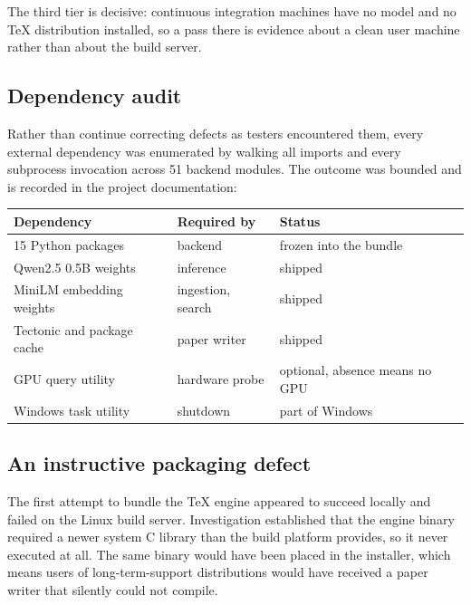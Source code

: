 \documentclass[11pt,a4paper]{article}
\begin{document}
The third tier is decisive: continuous integration machines have no model and no
TeX distribution installed, so a pass there is evidence about a clean user
machine rather than about the build server.

\subsection{Dependency audit}

Rather than continue correcting defects as testers encountered them, every
external dependency was enumerated by walking all imports and every subprocess
invocation across 51 backend modules. The outcome was bounded and is recorded in
the project documentation:

\begin{center}
\small
\begin{tabular}{@{}lll@{}}
\toprule
\textbf{Dependency} & \textbf{Required by} & \textbf{Status} \\
\midrule
15 Python packages & backend & frozen into the bundle \\
Qwen2.5 0.5B weights & inference & shipped \\
MiniLM embedding weights & ingestion, search & shipped \\
Tectonic and package cache & paper writer & shipped \\
GPU query utility & hardware probe & optional, absence means no GPU \\
Windows task utility & shutdown & part of Windows \\
\bottomrule
\end{tabular}
\end{center}

\subsection{An instructive packaging defect}

The first attempt to bundle the TeX engine appeared to succeed locally and
failed on the Linux build server. Investigation established that the engine
binary required a newer system C library than the build platform provides, so it
never executed at all. The same binary would have been placed in the installer,
which means users of long-term-support distributions would have received a paper
writer that silently could not compile.

\end{document}
